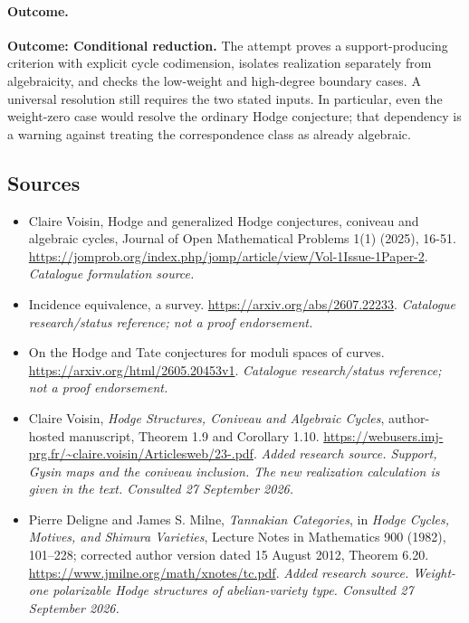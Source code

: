 \documentclass[11pt,a4paper]{article}
\begin{document}
\paragraph{Outcome.}
\textbf{Outcome: Conditional reduction.}
The attempt proves a support-producing criterion with explicit cycle
codimension, isolates realization separately from algebraicity, and checks
the low-weight and high-degree boundary cases. A universal resolution
still requires the two stated inputs. In particular, even the weight-zero
case would resolve the ordinary Hodge conjecture; that dependency is a
warning against treating the correspondence class as already algebraic.
\subsection{Sources}
\begin{itemize}\raggedright
\item[\textnormal{[S1]}]\hypertarget{source:statement:1}{} Claire Voisin, Hodge and generalized Hodge conjectures, coniveau and algebraic cycles, Journal of Open Mathematical Problems 1(1) (2025), 16-51.
\url{https://jomprob.org/index.php/jomp/article/view/Vol-1Issue-1Paper-2}.
{\small\textit{Catalogue formulation source.}}
\item[\textnormal{[S2]}]\hypertarget{source:statement:2}{} Incidence equivalence, a survey.
\url{https://arxiv.org/abs/2607.22233}.
{\small\textit{Catalogue research/status reference; not a proof endorsement.}}
\item[\textnormal{[S3]}]\hypertarget{source:statement:3}{} On the Hodge and Tate conjectures for moduli spaces of curves.
\url{https://arxiv.org/html/2605.20453v1}.
{\small\textit{Catalogue research/status reference; not a proof endorsement.}}
\item[\textnormal{[E1]}]\hypertarget{extra:statement:1}{} Claire Voisin, \emph{Hodge Structures, Coniveau and Algebraic Cycles}, author-hosted manuscript, Theorem 1.9 and Corollary 1.10.
\url{https://webusers.imj-prg.fr/~claire.voisin/Articlesweb/23-.pdf}.
{\small\textit{Added research source. Support, Gysin maps and the coniveau inclusion. The new realization calculation is given in the text. Consulted 27 September 2026.}}
\item[\textnormal{[E2]}]\hypertarget{extra:statement:2}{} Pierre Deligne and James S. Milne, \emph{Tannakian Categories}, in \emph{Hodge Cycles, Motives, and Shimura Varieties}, Lecture Notes in Mathematics 900 (1982), 101--228; corrected author version dated 15 August 2012, Theorem 6.20.
\url{https://www.jmilne.org/math/xnotes/tc.pdf}.
{\small\textit{Added research source. Weight-one polarizable Hodge structures of abelian-variety type. Consulted 27 September 2026.}}
\end{itemize}

\end{document}
